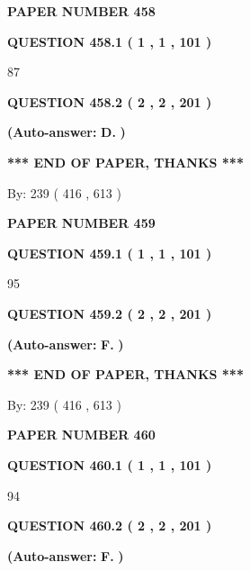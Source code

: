 \documentclass{ctexart}
\begin{document}
   
 {\textbf{ \Large{ PAPER NUMBER  458  }}}
   
   
   
   
  
  
{\textbf{\large{QUESTION
458.1 
 ( 1 , 1 , 101 )
}}}

87
  
  
{\textbf{\large{QUESTION
458.2 
 ( 2 , 2 , 201 )
}}}
 
 
{\textbf{(Auto-answer:}}
{\textbf{\large{
D.}}}
{\textbf{)}}
 
 
   
   
   
   
\vspace{1.0in} 
{\textbf{\large{ *** END OF PAPER, THANKS *** }}} 
   
   
\hspace{1.0in} By: 
 239 ( 416 ,  613 )
   
   
   
   
\newpage 
\setcounter{page}{ 
   459001 } 
   
   
 {\textbf{ \Large{ PAPER NUMBER  459  }}}
   
   
   
   
  
  
{\textbf{\large{QUESTION
459.1 
 ( 1 , 1 , 101 )
}}}

95
  
  
{\textbf{\large{QUESTION
459.2 
 ( 2 , 2 , 201 )
}}}
 
 
{\textbf{(Auto-answer:}}
{\textbf{\large{
F.}}}
{\textbf{)}}
 
 
   
   
   
   
\vspace{1.0in} 
{\textbf{\large{ *** END OF PAPER, THANKS *** }}} 
   
   
\hspace{1.0in} By: 
 239 ( 416 ,  613 )
   
   
   
   
\newpage 
\setcounter{page}{ 
   460001 } 
   
   
 {\textbf{ \Large{ PAPER NUMBER  460  }}}
   
   
   
   
  
  
{\textbf{\large{QUESTION
460.1 
 ( 1 , 1 , 101 )
}}}

94
  
  
{\textbf{\large{QUESTION
460.2 
 ( 2 , 2 , 201 )
}}}
 
 
{\textbf{(Auto-answer:}}
{\textbf{\large{
F.}}}
{\textbf{)}}
 
\end{document}
